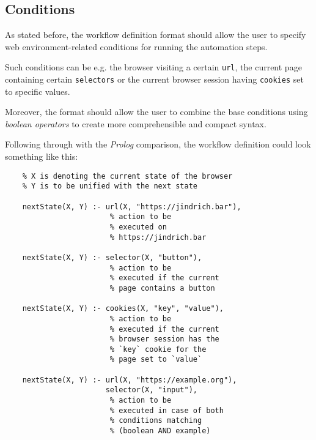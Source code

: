 
\subsection{Conditions}

As stated before, the workflow definition format should allow the user to specify web environment-related conditions for running the automation steps.

Such conditions can be e.g. the browser visiting a certain \texttt{url}, the current page containing certain \texttt{selectors} or the current browser session having \texttt{cookies} set to specific values.

Moreover, the format should allow the user to combine the base conditions using \textit{boolean operators} to create more comprehensible and compact syntax.

Following through with the \textit{Prolog} comparison, the workflow definition could look something like this:

\begin{minipage}{0.95\linewidth}
\begin{verbatim}
    % X is denoting the current state of the browser
    % Y is to be unified with the next state

    nextState(X, Y) :- url(X, "https://jindrich.bar"),
                        % action to be 
                        % executed on 
                        % https://jindrich.bar
    
    nextState(X, Y) :- selector(X, "button"),
                        % action to be 
                        % executed if the current 
                        % page contains a button
    
    nextState(X, Y) :- cookies(X, "key", "value"),
                        % action to be 
                        % executed if the current 
                        % browser session has the
                        % `key` cookie for the  
                        % page set to `value`
    
    nextState(X, Y) :- url(X, "https://example.org"),
                       selector(X, "input"),
                        % action to be 
                        % executed in case of both
                        % conditions matching 
                        % (boolean AND example)

\end{verbatim}
\end{minipage}


